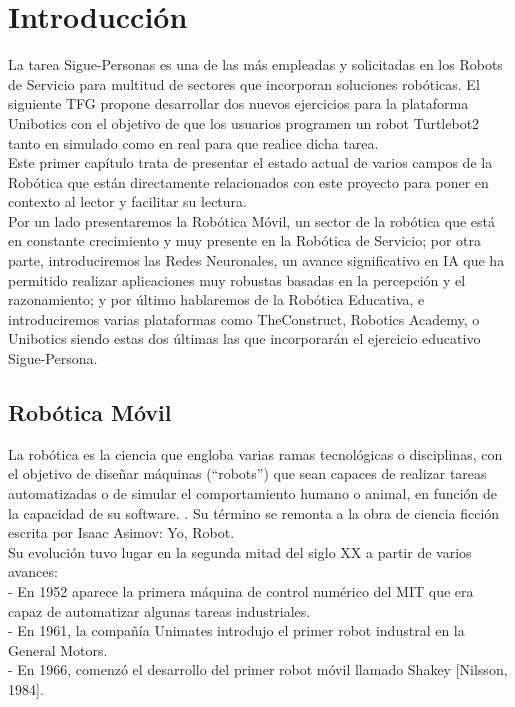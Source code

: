 \chapter{Introducción}
\label{cap:capitulo1}
\setcounter{page}{1}

La tarea Sigue-Personas es una de las más empleadas y solicitadas en los Robots de Servicio para multitud de sectores que incorporan soluciones robóticas. El siguiente TFG propone desarrollar dos nuevos ejercicios para la plataforma Unibotics con el objetivo de que los usuarios programen un robot Turtlebot2 tanto en simulado como en real para que realice dicha tarea.\\

Este primer capítulo trata de presentar el estado actual de varios campos de la Robótica que están directamente relacionados con este proyecto para poner en contexto al lector y facilitar su lectura.\\

Por un lado presentaremos la Robótica Móvil, un sector de la robótica que está en constante crecimiento y muy presente en la Robótica de Servicio; por otra parte, introduciremos las Redes Neuronales, un avance significativo en IA que ha permitido realizar aplicaciones muy robustas basadas en la percepción y el razonamiento; y por último hablaremos de la Robótica Educativa, e introduciremos varias plataformas como TheConstruct, Robotics Academy, o Unibotics siendo estas dos últimas las que incorporarán el ejercicio educativo Sigue-Persona.

\section{Robótica Móvil}
\label{sec:robotica_movil}

La robótica es la ciencia que engloba varias ramas tecnológicas o disciplinas, con el objetivo de diseñar máquinas (``robots'') que sean capaces de realizar tareas automatizadas o de simular el comportamiento humano o animal, en función de la capacidad de su software. \cite{revistaderobots}. Su término se remonta a la obra de ciencia ficción escrita por Isaac Asimov: Yo, Robot. \\

Su evolución tuvo lugar en la segunda mitad del siglo XX a partir de varios avances:\\
- En 1952 aparece la primera máquina de control numérico del MIT que era capaz de automatizar algunas tareas industriales.\\
- En 1961, la compañía Unimates introdujo el primer robot industral en la General Motors.\\
- En 1966, comenzó el desarrollo del primer robot móvil llamado Shakey [Nilsson, 1984].

